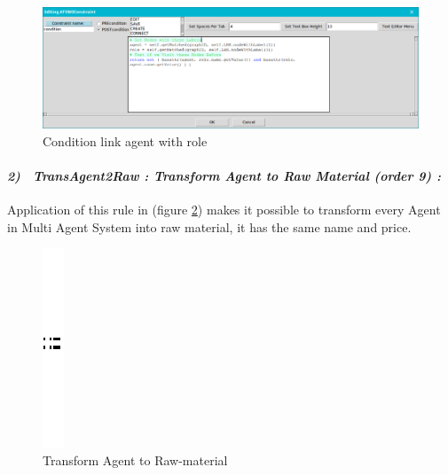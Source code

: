 \begin{figure}[th]
	\centering
 	\includegraphics[scale=0.37]{ch3/img/condrule1}
	\caption{\label{fig:Condition link agent with role}Condition link agent with role  }
\end{figure} 

\paragraph{\emph{2)~ TransAgent2Raw : Transform Agent to Raw Material (order 9) :} }
Application of this rule in (figure \ref{fig:Generate for each agent raw material}) makes it possible to transform  every Agent in Multi Agent System into raw material, it has the same name and price.
\vspace{1cm} 
\begin{figure}[th]
\centering
	\quad{}
		\includegraphics{ch3/img/sep}
	\quad{}
\caption{\label{fig:Generate for each agent raw material}Transform Agent to Raw-material} 
\end{figure}
